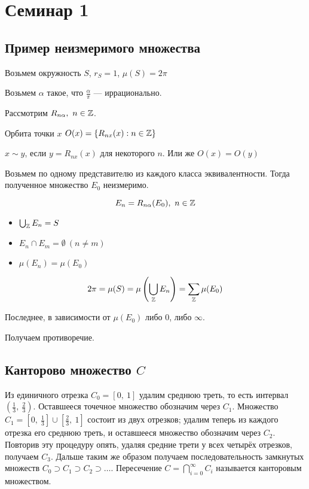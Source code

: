 \newpage

\section{Семинар 1}

\subsection{Пример неизмеримого множества}

Возьмем окружность $S$, $r_S = 1$, $\mu(S) = 2\pi$

Возьмем $\alpha$ такое, что $\frac{\alpha}{\pi}$ --- иррационально.

Рассмотрим $R_{n\alpha},\ n \in \mathbb{Z}$.

Орбита точки $x$ $O(x) = \left\{ R_{nx}(x) : n \in \mathbb{Z}\right\}$

$x \sim y$, если $y = R_{nx}(x)$ для некоторого $n$. Или же $O(x) = O(y)$

Возьмем по одному представителю из каждого класса эквивалентности. Тогда полученное множество $E_0$ неизмеримо.

$$E_n = R_{n\alpha}(E_0),\ n \in \mathbb{Z}$$

\begin{itemize}
  \item $\bigcup_{\mathbb{Z}} E_n = S$
  \item $E_n \cap E_m = \emptyset\ (n \ne m)$
  \item $\mu(E_n) = \mu(E_0)$
\end{itemize}

$$2\pi = \mu(S) = \mu\left(\bigcup_{\mathbb{Z}} E_n\right) = \sum_{\mathbb{Z}} \mu(E_0)$$

Последнее, в зависимости от $\mu(E_0)$ либо 0, либо $\infty$.

Получаем противоречие.


\subsection{Канторово множество $C$}

Из единичного отрезка 
$C_{0}=[0,\ 1]$ удалим среднюю треть, то есть интервал 
$(\frac{1}{3},\ \frac{2}{3})$. Оставшееся точечное множество обозначим через 
$C_{1}$. Множество $C_{1}=[0,\ \frac{1}{3}] \cup [\frac{2}{3},\ 1]$ состоит из двух
отрезков; удалим теперь из каждого отрезка его среднюю треть, и оставшееся множество обозначим через 
$C_{2}$. Повторив эту процедуру опять, удаляя средние трети у всех четырёх отрезков, получаем 
$C_{3}$. Дальше таким же образом получаем последовательность замкнутых множеств
$\displaystyle C_{0}\supset C_{1}\supset C_{2}\supset \dots $. Пересечение
$C=\bigcap _{i=0}^{\infty }C_{i}$
называется канторовым множеством.

